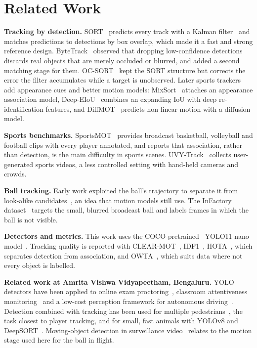 \section{Related Work}
\textbf{Tracking by detection.} SORT~\cite{sort} predicts every track with a
Kalman filter~\cite{kalman} and matches predictions to detections by box overlap,
which made it a fast and strong reference design. ByteTrack~\cite{bytetrack}
observed that dropping low-confidence detections discards real objects that are
merely occluded or blurred, and added a second matching stage for them.
OC-SORT~\cite{ocsort} kept the SORT structure but corrects the error the filter
accumulates while a target is unobserved. Later sports trackers add appearance
cues and better motion models: MixSort~\cite{sportsmot} attaches an appearance
association model, Deep-EIoU~\cite{deepeiou} combines an expanding IoU with deep
re-identification features, and DiffMOT~\cite{diffmot} predicts non-linear motion
with a diffusion model.

\textbf{Sports benchmarks.} SportsMOT~\cite{sportsmot} provides broadcast
basketball, volleyball and football clips with every player annotated, and
reports that association, rather than detection, is the main difficulty in
sports scenes. UVY-Track~\cite{uvy} collects user-generated sports videos, a less
controlled setting with hand-held cameras and crowds.

\textbf{Ball tracking.} Early work exploited the ball's trajectory to separate it
from look-alike candidates~\cite{yu2006}, an idea that motion models still use.
The InFactory dataset~\cite{infactory} targets the small, blurred broadcast ball
and labels frames in which the ball is not visible.

\textbf{Detectors and metrics.} This work uses the COCO-pretrained~\cite{coco}
YOLO11 nano model~\cite{yolo11}. Tracking quality is reported with
CLEAR-MOT~\cite{clear}, IDF1~\cite{idf1}, HOTA~\cite{hota}, which separates
detection from association, and OWTA~\cite{owta}, which suits data where not
every object is labelled.

\textbf{Related work at Amrita Vishwa Vidyapeetham, Bengaluru.} YOLO detectors
have been applied to online exam proctoring~\cite{singh2024proctor}, classroom
attentiveness monitoring~\cite{nair2023attentive} and a low-cost perception
framework for autonomous driving~\cite{gopikiran2025driving}. Detection combined
with tracking has been used for multiple pedestrians~\cite{kumar2023pedestrian},
the task closest to player tracking, and for small, fast animals with YOLOv8 and
DeepSORT~\cite{peri2023animals}. Moving-object detection in surveillance
video~\cite{aarthi2016moving} relates to the motion stage used here for the ball
in flight.

